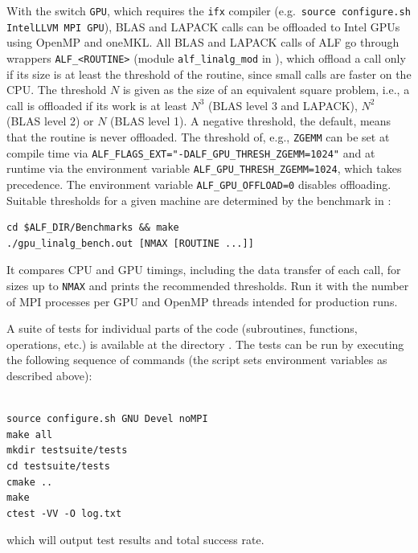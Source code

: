 With the switch \texttt{GPU}, which requires the \texttt{ifx} compiler (e.g.\ \texttt{source configure.sh IntelLLVM MPI GPU}), BLAS and LAPACK calls can be offloaded to Intel GPUs using OpenMP and oneMKL. All BLAS and LAPACK calls of ALF go through wrappers \texttt{ALF\_<ROUTINE>} (module \texttt{alf\_linalg\_mod} in ), which offload a call only if its size is at least the threshold of the routine, since small calls are faster on the CPU. The threshold $N$ is given as the size of an equivalent square problem, i.e., a call is offloaded if its work is at least $N^3$ (BLAS level 3 and LAPACK), $N^2$ (BLAS level 2) or $N$ (BLAS level 1). A negative threshold, the default, means that the routine is never offloaded. The threshold of, e.g., \texttt{ZGEMM} can be set at compile time via \texttt{ALF\_FLAGS\_EXT="-DALF\_GPU\_THRESH\_ZGEMM=1024"} and at runtime via the environment variable \texttt{ALF\_GPU\_THRESH\_ZGEMM=1024}, which takes precedence. The environment variable \texttt{ALF\_GPU\_OFFLOAD=0} disables offloading. Suitable thresholds for a given machine are determined by the benchmark in :

\vspace{-\baselineskip}
\begin{lstlisting}[style=bash,morekeywords={make}]
cd $ALF_DIR/Benchmarks && make
./gpu_linalg_bench.out [NMAX [ROUTINE ...]]
\end{lstlisting}
It compares CPU and GPU timings, including the data transfer of each call, for sizes up to \texttt{NMAX} and prints the recommended thresholds. Run it with the number of MPI processes per GPU and OpenMP threads intended for production runs.

A suite of tests for individual parts of the code (subroutines, functions, operations, etc.) is available at the directory . The tests can be run by executing the following sequence of commands (the script  sets environment variables as described above):

\vspace{-\baselineskip}
\begin{lstlisting}[style=bash,morekeywords={make,cmake,ctest}]

source configure.sh GNU Devel noMPI
make all
mkdir testsuite/tests
cd testsuite/tests
cmake ..
make
ctest -VV -O log.txt
\end{lstlisting}
which will output test results and total success rate.

%
